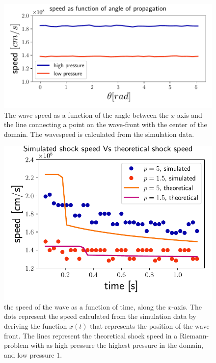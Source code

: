 \begin{figure}[H]
	\centering
	\includegraphics[width=\linewidth]{images/speed-angle-hd.pdf}
	\caption{The wave speed as a function of the angle between the $x$-axis and the line connecting a point on the wave-front with the center of the domain. The wavespeed is calculated from the simulation data.}
	\label{fig:speed-angle-hd}
\end{figure}

\begin{figure}[H]
	\centering
	\includegraphics[width=\linewidth]{images/speed-time-hd.pdf}
	\caption{the speed of the wave as a function of time, along the $x$-axis. The dots represent the speed calculated from the simulation data by deriving the function $x(t)$ that represents the position of the wave front. The lines represent the theoretical shock speed in a Riemann-problem with as high pressure the highest pressure in the domain, and low pressure $1$.}
	\label{fig:speed-time-hd}
\end{figure}

\newpage

